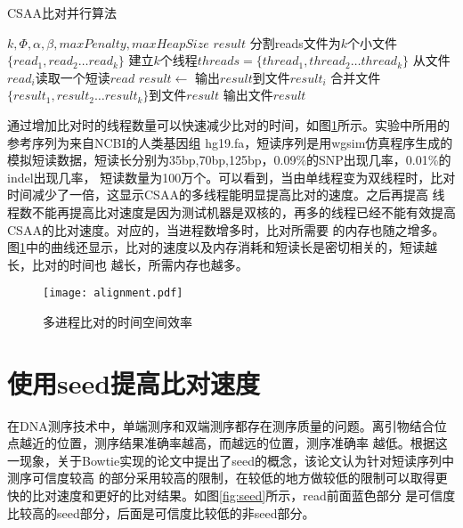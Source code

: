 \begin{algorithm}
    \caption{CSAA比对并行算法}
    \label{alg:mt}
    \begin{algorithmic}[1]
        \Require $k,\Phi,\alpha,\beta,maxPenalty,maxHeapSize$
        \Ensure $result$
        \State 分割reads文件为$k$个小文件$\{read_1,read_2 \ldots read_k \}$
        \State 建立$k$个线程$threads=\{thread_1,thread_2\ldots thread_k\}$
            \State 从文件$read_i$读取一个短读$read$
            \State {}
            \State $result \gets $ 
            \State 输出$result$到文件$result_i$
        \EndFor
        \State 合并文件$\{result_1,result_2\ldots result_k\}$到文件$result$
        \State 输出文件$result$
        \EndFunction
    \end{algorithmic}
\end{algorithm}

通过增加比对时的线程数量可以快速减少比对的时间，如图\ref{fig:alignment}所示。实验中所用的参考序列为来自NCBI的人类基因组
hg19.fa，短读序列是用wgsim仿真程序生成的模拟短读数据，短读长分别为35bp,70bp,125bp，0.09\%的SNP出现几率，0.01\%的indel出现几率，
短读数量为100万个。可以看到，当由单线程变为双线程时，比对时间减少了一倍，这显示CSAA的多线程能明显提高比对的速度。之后再提高
线程数不能再提高比对速度是因为测试机器是双核的，再多的线程已经不能有效提高CSAA的比对速度。对应的，当进程数增多时，比对所需要
的内存也随之增多。图\ref{fig:alignment}中的曲线还显示，比对的速度以及内存消耗和短读长是密切相关的，短读越长，比对的时间也
越长，所需内存也越多。

\begin{figure}[htbp]
    \centering
    \texttt{[image: alignment.pdf]}
    \caption{多进程比对的时间空间效率} \label{fig:alignment}
\end{figure}

\section{使用seed提高比对速度}
在DNA测序技术中，单端测序和双端测序都存在测序质量的问题。离引物结合位点越近的位置，测序结果准确率越高，而越远的位置，测序准确率
越低。根据这一现象，关于Bowtie实现的论文\cite{langmead2009ultrafast}中提出了seed的概念，该论文认为针对短读序列中测序可信度较高
的部分采用较高的限制，在较低的地方做较低的限制可以取得更快的比对速度和更好的比对结果。如图\ref{fig:seed}所示，read前面蓝色部分
是可信度比较高的seed部分，后面是可信度比较低的非seed部分。

